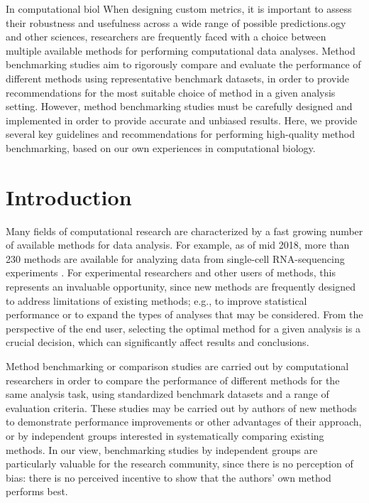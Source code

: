 \documentclass[12pt, a4paper]{article}
\begin{document}
In computational biol When designing custom metrics, it is important to assess their robustness and usefulness across a wide range of possible predictions.ogy and other sciences, researchers are frequently faced with a choice between multiple available methods for performing computational data analyses. Method benchmarking studies aim to rigorously compare and evaluate the performance of different methods using representative benchmark datasets, in order to provide recommendations for the most suitable choice of method in a given analysis setting. However, method benchmarking studies must be carefully designed and implemented in order to provide accurate and unbiased results. Here, we provide several key guidelines and recommendations for performing high-quality method benchmarking, based on our own experiences in computational biology.




\section*{Introduction}

Many fields of computational research are characterized by a fast growing number of available methods for data analysis. For example, as of mid 2018, more than 230 methods are available for analyzing data from single-cell RNA-sequencing experiments \citep{Zappia2018}. For experimental researchers and other users of methods, this represents an invaluable opportunity, since new methods are frequently designed to address limitations of existing methods; e.g., to improve statistical performance or to expand the types of analyses that may be considered. From the perspective of the end user, selecting the optimal method for a given analysis is a crucial decision, which can significantly affect results and conclusions.

Method benchmarking or comparison studies are carried out by computational researchers in order to compare the performance of different methods for the same analysis task, using standardized benchmark datasets and a range of evaluation criteria. These studies may be carried out by authors of new methods to demonstrate performance improvements or other advantages of their approach, or by independent groups interested in systematically comparing existing methods. In our view, benchmarking studies by independent groups are particularly valuable for the research community, since there is no perception of bias: there is no perceived incentive to show that the authors' own method performs best.
\end{document}

